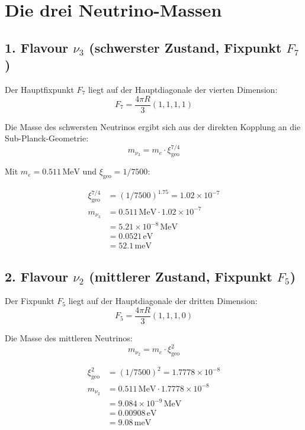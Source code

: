 \documentclass[11pt,a4paper]{article}
\newcommand{\xigeo}{\xi_{\text{geo}}}
\begin{document}
	\section{Die drei Neutrino-Massen}
	
	\subsection{1. Flavour $\nu_3$ (schwerster Zustand, Fixpunkt $F_7$)}
	
	Der Hauptfixpunkt $F_7$ liegt auf der Hauptdiagonale der vierten Dimension:
	\begin{equation}
		F_7 = \frac{4\pi R}{3}(1, 1, 1, 1)
	\end{equation}
	
	Die Masse des schwersten Neutrinos ergibt sich aus der direkten Kopplung an die Sub-Planck-Geometrie:
	\begin{equation}
		m_{\nu_3} = m_e \cdot \xigeo^{7/4}
	\end{equation}
	
	Mit $m_e = 0.511\,\text{MeV}$ und $\xigeo = 1/7500$:
	
	\begin{align}
		\xigeo^{7/4} &= (1/7500)^{1.75} = 1.02 \times 10^{-7} \\
		m_{\nu_3} &= 0.511\,\text{MeV} \cdot 1.02 \times 10^{-7} \\
		&= 5.21 \times 10^{-8}\,\text{MeV} \\
		&= 0.0521\,\text{eV} \\
		&= 52.1\,\text{meV}
	\end{align}
	
	\subsection{2. Flavour $\nu_2$ (mittlerer Zustand, Fixpunkt $F_5$)}
	
	Der Fixpunkt $F_5$ liegt auf der Hauptdiagonale der dritten Dimension:
	\begin{equation}
		F_5 = \frac{4\pi R}{3}(1, 1, 1, 0)
	\end{equation}
	
	Die Masse des mittleren Neutrinos:
	\begin{equation}
		m_{\nu_2} = m_e \cdot \xigeo^{2}
	\end{equation}
	
	\begin{align}
		\xigeo^{2} &= (1/7500)^2 = 1.7778 \times 10^{-8} \\
		m_{\nu_2} &= 0.511\,\text{MeV} \cdot 1.7778 \times 10^{-8} \\
		&= 9.084 \times 10^{-9}\,\text{MeV} \\
		&= 0.00908\,\text{eV} \\
		&= 9.08\,\text{meV}
	\end{align}
	
\end{document}
